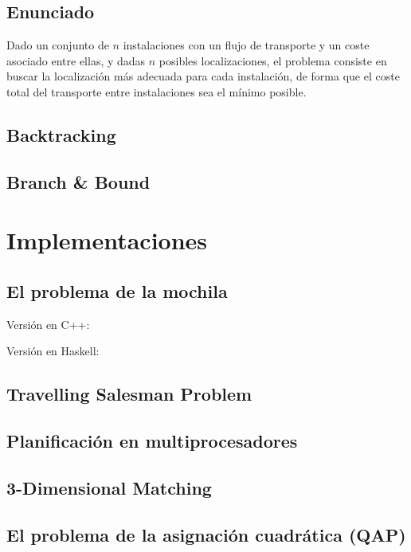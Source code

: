 \documentclass[a4paper, 11pt]{article} %
\begin{document}
  \subsection{Enunciado}
   Dado un conjunto de $n$ instalaciones con un flujo de transporte y un coste asociado entre ellas, y dadas $n$ posibles localizaciones, el problema consiste en buscar la localización más adecuada para cada instalación, de forma que el coste total del transporte entre instalaciones sea el mínimo posible. 

  \subsection{Backtracking}
  \subsection{Branch \& Bound}


\section{Implementaciones}
  \subsection{El problema de la mochila}
        Versión en C++:
        
        \small
  	\texttt{}
        \normalsize
        
        Versión en Haskell:
        
        \small
  	\texttt{}
        \normalsize
        
  \subsection{Travelling Salesman Problem}
        \small
  	\texttt{}
        \normalsize
  \subsection{Planificación en multiprocesadores}
        \small
  	\texttt{}
        \normalsize
  \subsection{3-Dimensional Matching}
        \small
  	\texttt{}
        \normalsize
  \subsection{El problema de la asignación cuadrática (QAP)}
        \small
        \normalsize

    
\end{document}
